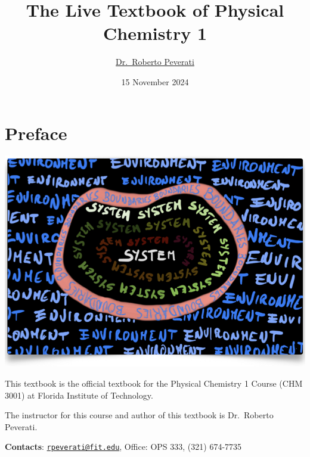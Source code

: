 \documentclass[
  9pt,
]{extbook}
\title{The Live Textbook of Physical Chemistry 1}
\author{\href{mailto:rpeverati@fit.edu}{Dr.~Roberto Peverati}}
\date{15 November 2024}
\let\oldmaketitle\maketitle
\theoremstyle{definition}
\theoremstyle{definition}
\theoremstyle{definition}
\theoremstyle{definition}
\theoremstyle{remark}
\begin{document}
\maketitle


%
\newpage

\let\maketitle\oldmaketitle

\renewcommand\thepage{\romannumeral\numexpr\value{page}-1\relax}


{
\setcounter{tocdepth}{1}
\tableofcontents
}
\renewcommand{\arraystretch}{1.8}

\chapter*{Preface}\label{preface}

\begin{center}\includegraphics[width=0.8\linewidth]{./img/OEP_Figures.000} \end{center}

This textbook is the official textbook for the Physical Chemistry 1 Course (CHM 3001) at Florida Institute of Technology.

The instructor for this course and author of this textbook is Dr.~Roberto Peverati.

\textbf{Contacts}: \href{mailto:rpeverati@fit.edu}{\nolinkurl{rpeverati@fit.edu}}, Office: OPS 333, (321) 674-7735
\end{document}
